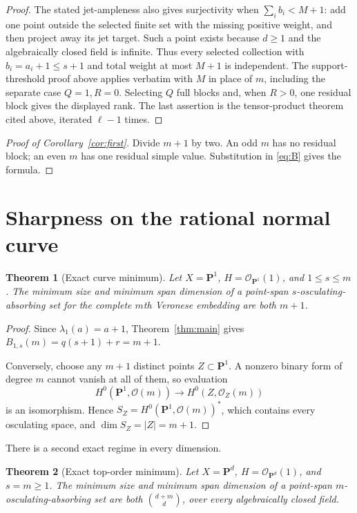 \documentclass[11pt]{article}
\newtheorem{theorem}{Theorem}[section]
\theoremstyle{definition}
\theoremstyle{remark}
\theoremstyle{plain}
\newcommand{\PP}{\mathbf P}
\newcommand{\cO}{\mathcal O}
\begin{document}
\begin{proof}
The stated jet-ampleness also gives surjectivity when $\sum_i b_i<M+1$:
add one point outside the selected finite set with the missing positive
weight, and then project away its jet target.  Such a point exists because
$d\geq1$ and the algebraically closed field is infinite.  Thus every selected
collection with $b_i=a_i+1\leq s+1$ and total weight at most $M+1$ is
independent.  The support-threshold proof above applies verbatim with $M$ in
place of $m$, including the separate case $Q=1,R=0$.  Selecting $Q$ full
blocks and, when $R>0$, one residual block gives the displayed rank.  The
last assertion is the tensor-product theorem cited above, iterated $\ell-1$
times.
\end{proof}

\begin{proof}[Proof of Corollary~\ref{cor:first}]
Divide $m+1$ by two.  An odd $m$ has no residual block; an even $m$ has one
residual simple value.  Substitution in \eqref{eq:B} gives the formula.
\end{proof}

\section{Sharpness on the rational normal curve}

\begin{theorem}[Exact curve minimum]\label{thm:curve}
Let $X=\PP^1$, $H=\cO_{\PP^1}(1)$, and $1\leq s\leq m$.  The minimum size
and minimum span dimension of a point-span $s$-osculating-absorbing set for
the complete $m$th Veronese embedding are both $m+1$.
\end{theorem}

\begin{proof}
Since $\lambda_1(a)=a+1$, Theorem~\ref{thm:main} gives
$B_{1,s}(m)=q(s+1)+r=m+1$.

Conversely, choose any $m+1$ distinct points $Z\subset\PP^1$.  A nonzero
binary form of degree $m$ cannot vanish at all of them, so evaluation
\[
 H^0(\PP^1,\cO(m))\longrightarrow H^0(Z,\cO_Z(m))
\]
is an isomorphism.  Hence $S_Z=H^0(\PP^1,\cO(m))^*$, which contains every
osculating space, and $\dim S_Z=|Z|=m+1$.
\end{proof}

There is a second exact regime in every dimension.

\begin{theorem}[Exact top-order minimum]\label{thm:top-order}
Let $X=\PP^d$, $H=\cO_{\PP^d}(1)$, and $s=m\geq1$.  The minimum size and
minimum span dimension of a point-span $m$-osculating-absorbing set are both
\(\binom{d+m}{d}\), over every algebraically closed field.
\end{theorem}
\end{document}
